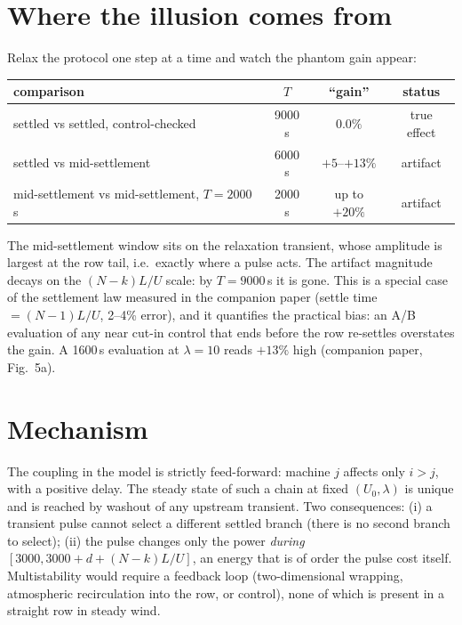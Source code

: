 \documentclass[11pt]{article}
\begin{document}
\section{Where the illusion comes from}

Relax the protocol one step at a time and watch the phantom gain appear:

\begin{center}\small
\begin{tabular}{lccc}
\toprule
comparison & $T$ & ``gain'' & status\\
\midrule
settled vs settled, control-checked & 9000 s & $0.0\%$ & true effect\\
settled vs mid-settlement & 6000 s & $+5$--$+13\%$ & artifact\\
mid-settlement vs mid-settlement, $T=2000$ s & 2000 s & up to $+20\%$ & artifact\\
\bottomrule
\end{tabular}
\end{center}

The mid-settlement window sits on the relaxation transient, whose amplitude is largest at
the row tail, i.e.\ exactly where a pulse acts. The artifact magnitude decays on the
$(N-k)L/U$ scale: by $T=9000$\,s it is gone. This is a special case of the settlement law
measured in the companion paper (settle time $= (N-1)L/U$, 2--4\% error), and it quantifies
the practical bias: an A/B evaluation of any near cut-in control that ends before the row
re-settles overstates the gain. A 1600\,s evaluation at $\lambda=10$ reads $+13\%$ high
(companion paper, Fig.~5a).

\section{Mechanism}

The coupling in the model is strictly feed-forward: machine $j$ affects only $i>j$, with a
positive delay. The steady state of such a chain at fixed $(U_0,\lambda)$ is unique and is
reached by washout of any upstream transient. Two consequences: (i) a transient pulse cannot
select a different settled branch (there is no second branch to select); (ii) the pulse
changes only the power \emph{during} $[3000, 3000+d+(N-k)L/U]$, an energy that is of order
the pulse cost itself. Multistability would require a feedback loop (two-dimensional
wrapping, atmospheric recirculation into the row, or control), none of which is present in a
straight row in steady wind.
\end{document}
